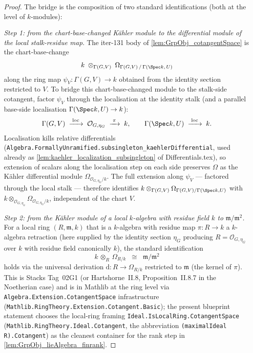 \begin{proof}
  
  The bridge is the composition of two standard identifications (both at the level of \(k\)-modules):

  \emph{Step 1: from the chart-base-changed Kähler module to the differential module of the local stalk-residue map.} The iter-131 body of \cref{lem:GrpObj_cotangentSpace} is the chart-base-change
  \[
    k \;\otimes_{\Gamma(G, V)}\; \Omega_{\Gamma(G, V)\,/\,\Gamma(\Spec k,\,U)}
  \]
  along the ring map \(\psi_V \colon \Gamma(G, V) \to k\) obtained from the identity section restricted to \(V\). To bridge this chart-base-changed module to the stalk-side cotangent, factor \(\psi_V\) through the localisation at the identity stalk (and a parallel base-side localisation \(\Gamma(\Spec k, U) \to k\)):
  \[
    \Gamma(G, V) \;\xrightarrow{\;\text{loc}\;}\; \mathcal O_{G, \eta_G} \;\xrightarrow{\;\pi\;}\; k,
    \qquad
    \Gamma(\Spec k, U) \;\xrightarrow{\;\text{loc}\;}\; k.
  \]
  Localisation kills relative differentials (\texttt{Algebra.FormallyUnramified.subsingleton\_kaehlerDifferential}, used already as \cref{lem:kaehler_localization_subsingleton} of Differentials.tex), so extension of scalars along the localisation step on each side preserves \(\Omega\) as the Kähler differential module \(\Omega_{\mathcal O_{G, \eta_G}/k}\). The full extension along \(\psi_V\) — factored through the local stalk — therefore identifies \(k \otimes_{\Gamma(G, V)} \Omega_{\Gamma(G, V)/\Gamma(\Spec k, U)}\) with \(k \otimes_{\mathcal O_{G, \eta_G}} \Omega_{\mathcal O_{G, \eta_G}/k}\), independent of the chart \(V\).

  \emph{Step 2: from the Kähler module of a local \(k\)-algebra with residue field \(k\) to \(\mathfrak m / \mathfrak m^{2}\).} For a local ring \((R, \mathfrak m, k)\) that is a \(k\)-algebra with residue map \(\pi \colon R \to k\) a \(k\)-algebra retraction (here supplied by the identity section \(\eta_G\) producing \(R = \mathcal O_{G, \eta_G}\) over \(k\) with residue field canonically \(k\)), the standard identification
  \[
    k \,\otimes_{R}\, \Omega_{R/k} \;\;\cong\;\; \mathfrak m \big/ \mathfrak m^{2}
  \]
  holds via the universal derivation \(\mathrm{d} \colon R \to \Omega_{R/k}\) restricted to \(\mathfrak m\) (the kernel of \(\pi\)). This is Stacks Tag~02G1 (or Hartshorne~II.8, Proposition~II.8.7 in the Noetherian case) and is in Mathlib at the ring level via \texttt{Algebra.Extension.CotangentSpace} infrastructure (\texttt{Mathlib.RingTheory.Extension.Cotangent.Basic}); the present blueprint statement chooses the local-ring framing \texttt{Ideal.IsLocalRing.CotangentSpace} (\texttt{Mathlib.RingTheory.Ideal.Cotangent}, the abbreviation \texttt{(maximalIdeal R).Cotangent}) as the cleanest container for the rank step in \cref{lem:GrpObj_lieAlgebra_finrank}.


\end{proof}
